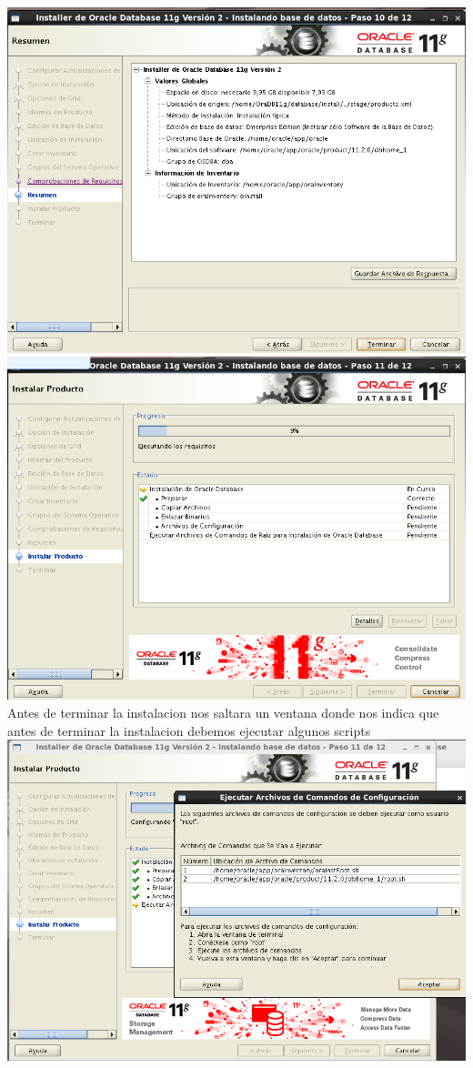 \documentclass[a4paper,openright,12pt]{book}
\begin{document}
\begin{center}
\includegraphics[width=15cm]{./oracle linux/23.png}\includegraphics[width=15cm]{./oracle linux/24.png}
Antes de terminar la instalacion nos saltara un ventana donde nos indica que antes de terminar la instalacion debemos ejecutar algunos scripts
\includegraphics[width=15cm]{./oracle linux/25.png}

\end{center}
\end{document}
